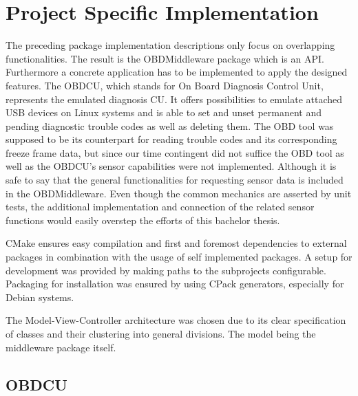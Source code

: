 

\chapter{Project Specific Implementation}

The preceding package implementation descriptions only focus on overlapping functionalities. 
The result is the OBDMiddleware package which is an API.
Furthermore a concrete application has to be implemented to apply the designed features.
The OBDCU, which stands for On Board Diagnosis Control Unit, represents the emulated diagnosis CU.
It offers possibilities to emulate attached USB devices on Linux systems and is able to set and unset
permanent and pending diagnostic trouble codes as well as deleting them. 
The OBD tool was supposed to be its counterpart for reading trouble codes and its corresponding freeze frame data,
but since our time contingent did not suffice the OBD tool as well as the OBDCU’s sensor capabilities were not implemented. 
Although it is safe to say that the general functionalities for requesting sensor data is included in the OBDMiddleware. 
Even though the common mechanics are asserted by unit tests,
the additional implementation and connection of the related sensor functions would easily overstep the efforts of this bachelor thesis.

CMake ensures easy compilation and first and foremost dependencies to external packages
in combination with the usage of self implemented packages. 
A setup for development was provided by making paths to the subprojects configurable. 
Packaging for installation was ensured by using CPack generators, especially for Debian systems.

The Model-View-Controller architecture was chosen due to its clear specification of classes and their clustering into general divisions. The model being the middleware package itself.

\section{OBDCU}

